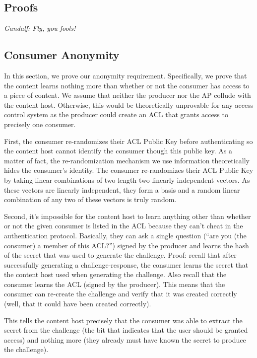 \documentclass[pdftex,12pt,a4papaer,twoside,notitlepage]{report}
\begin{document}
\begin{appendices}

\chapter{Proofs}

\emph{Gandalf: Fly, you fools!}

\section{Consumer Anonymity}

In this section, we prove our anonymity requirement. Specifically, we prove that
the content learns nothing more than whether or not the consumer has access to a
piece of content. We assume that neither the producer nor the AP collude with
the content host. Otherwise, this would be theoretically unprovable for any
access control system as the producer could create an ACL that grants access to
precisely one consumer.

First, the consumer re-randomizes their ACL Public Key before authenticating so
the content host cannot identify the consumer though this public key. As a
matter of fact, the re-randomization mechanism we use information theoretically
hides the consumer's identity. The consumer re-randomizes their ACL Public Key
by taking linear combinations of two length-two linearly independent vectors. As
these vectors are linearly independent, they form a basis and a random linear
combination of any two of these vectors is truly random.

Second, it's impossible for the content host to learn anything other than
whether or not the given consumer is listed in the ACL because they can't cheat
in the authentication protocol. Basically, they can ask a single question (``are
you (the consumer) a member of this ACL?'') signed by the producer and learns
the hash of the secret that was used to generate the challenge. Proof: recall
that after successfully generating a challenge-response, the consumer learns the
secret that the content host used when generating the challenge. Also recall
that the consumer learns the ACL (signed by the producer). This means that the
consumer can re-create the challenge and verify that it was created correctly
(well, that it could have been created correctly).

This tells the content host precisely that the consumer was able to extract the
secret from the challenge (the bit that indicates that the user should be
granted access) and nothing more (they already must have known the secret to
produce the challenge).


\end{appendices}
\end{document}
